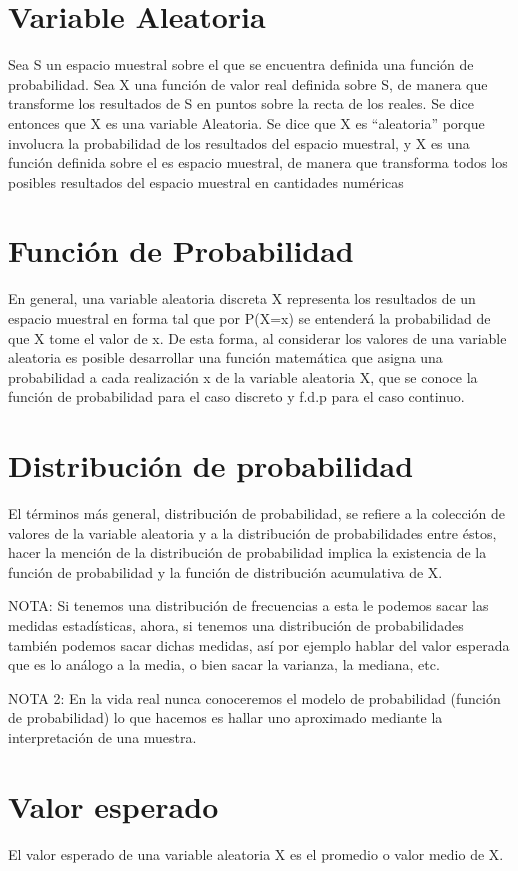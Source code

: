 \documentclass{book}
\begin{document}
\section{Variable Aleatoria} Sea S un espacio muestral sobre el que se encuentra definida una función de probabilidad. Sea X una función de valor real definida sobre S, de manera que transforme los resultados de S en puntos sobre la recta de los reales. Se dice entonces que X es una variable Aleatoria.
Se dice que X es “aleatoria” porque involucra la probabilidad de los resultados del espacio muestral, y X es una función definida sobre el es espacio muestral, de manera que transforma todos los posibles resultados del espacio muestral en cantidades numéricas

\section{Función de Probabilidad}
En general, una variable aleatoria discreta X representa los resultados de un espacio muestral en forma tal que por P(X=x) se entenderá la probabilidad de que X tome el valor de x. De esta forma, al considerar los valores de una variable aleatoria es posible desarrollar una función matemática que asigna una probabilidad a cada realización x de la variable aleatoria X, que se conoce la función de probabilidad para el caso discreto y f.d.p para el caso continuo. 


\section{Distribución de probabilidad} 
El términos más general, distribución de probabilidad, se refiere a la colección de valores de la variable aleatoria y a la distribución de probabilidades entre éstos, hacer la mención de la distribución de probabilidad implica la existencia de la función de probabilidad y la función de distribución acumulativa de X.

NOTA: Si tenemos una distribución de frecuencias a esta le podemos sacar las medidas estadísticas, ahora, si tenemos una distribución de probabilidades también podemos  sacar dichas medidas, así por ejemplo hablar del valor esperada que es lo análogo a la media, o bien sacar la varianza, la mediana, etc.

NOTA 2: En la vida real nunca conoceremos el modelo de probabilidad (función de probabilidad) lo que hacemos es hallar uno aproximado mediante la interpretación de una muestra.

\section{Valor esperado}
El valor esperado de una variable aleatoria X es el promedio o valor medio de X. 
\end{document}
